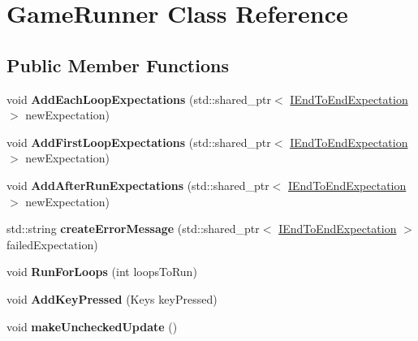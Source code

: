 \hypertarget{classGameRunner}{}\section{Game\+Runner Class Reference}
\label{classGameRunner}
\subsection*{Public Member Functions}
\begin{DoxyCompactItemize}
\item 
void {\bfseries Add\+Each\+Loop\+Expectations} (std\+::shared\+\_\+ptr$<$ \hyperlink{classIEndToEndExpectation}{I\+End\+To\+End\+Expectation} $>$ new\+Expectation)\hypertarget{classGameRunner_a02e5260aca1b02222229e5de7b7bab35}{}\label{classGameRunner_a02e5260aca1b02222229e5de7b7bab35}

\item 
void {\bfseries Add\+First\+Loop\+Expectations} (std\+::shared\+\_\+ptr$<$ \hyperlink{classIEndToEndExpectation}{I\+End\+To\+End\+Expectation} $>$ new\+Expectation)\hypertarget{classGameRunner_a967f98898ffcac8d4aca6230607446ea}{}\label{classGameRunner_a967f98898ffcac8d4aca6230607446ea}

\item 
void {\bfseries Add\+After\+Run\+Expectations} (std\+::shared\+\_\+ptr$<$ \hyperlink{classIEndToEndExpectation}{I\+End\+To\+End\+Expectation} $>$ new\+Expectation)\hypertarget{classGameRunner_a74b8c7f031062743104a31f6d453b637}{}\label{classGameRunner_a74b8c7f031062743104a31f6d453b637}

\item 
std\+::string {\bfseries create\+Error\+Message} (std\+::shared\+\_\+ptr$<$ \hyperlink{classIEndToEndExpectation}{I\+End\+To\+End\+Expectation} $>$ failed\+Expectation)\hypertarget{classGameRunner_a8e6ab5e54a322f9b13123758d457f1e7}{}\label{classGameRunner_a8e6ab5e54a322f9b13123758d457f1e7}

\item 
void {\bfseries Run\+For\+Loops} (int loops\+To\+Run)\hypertarget{classGameRunner_aa0c9e410e8df3b074860ea3a7fe4f8d1}{}\label{classGameRunner_aa0c9e410e8df3b074860ea3a7fe4f8d1}

\item 
void {\bfseries Add\+Key\+Pressed} (Keys key\+Pressed)\hypertarget{classGameRunner_aba2c9bd5cb90c4567b664733ca3f965d}{}\label{classGameRunner_aba2c9bd5cb90c4567b664733ca3f965d}

\item 
void {\bfseries make\+Unchecked\+Update} ()\hypertarget{classGameRunner_af21f66e2e47f6788f95a6a19943bb3fc}{}\label{classGameRunner_af21f66e2e47f6788f95a6a19943bb3fc}


\end{DoxyCompactItemize}
